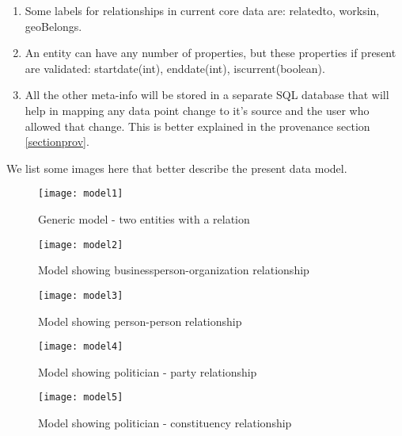\begin {enumerate}
\item  Some labels for relationships in current core data are: relatedto, worksin, geoBelongs.

\item An entity can have any number of properties, but these properties if present are validated: startdate(int), enddate(int), iscurrent(boolean).

\item All the other meta-info will be stored in a separate SQL database that will help in mapping any data point change to it's source and the user who allowed that change. This is better explained in the provenance section \ref{sectionprov}.

\end{enumerate}

We list some images here that better describe the present data model. 

\begin{figure}[H]
\begin{center}	
\texttt{[image: model1]} 
\caption{Generic model - two entities with a relation}
\label{fig:model1}
\end{center}
\end{figure}

\begin{figure}[H]
\begin{center}	
\texttt{[image: model2]} 
\caption{Model showing businessperson-organization relationship }
\label{fig:model2}
\end{center}
\end{figure}

\begin{figure}[H]
\begin{center}	
\texttt{[image: model3]} 
\caption{Model showing person-person relationship}
\label{fig:model3}
\end{center}
\end{figure}

\begin{figure}[H]
\begin{center}	
\texttt{[image: model4]} 
\caption{Model showing politician - party relationship }
\label{fig:model4}
\end{center}
\end{figure}

\begin{figure}[H]
\begin{center}	
\texttt{[image: model5]} 
\caption{Model showing politician  - constituency relationship}
\label{fig:model5}
\end{center}
\end{figure}

